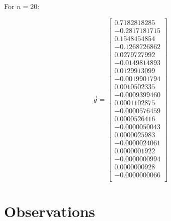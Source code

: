 \documentclass{article}
\begin{document}
For $n=20$:

$$
\vec{y}=
\begin{bmatrix}
0.7182818285\\
-0.2817181715\\
0.1548454854\\
-0.1268726862\\
0.0279727992\\
-0.0149814893\\
0.0129913099\\
-0.0019901794\\
0.0010502335\\
-0.0009399460\\
0.0001102875\\
-0.0000576459\\
0.0000526416\\
-0.0000050043\\
0.0000025983\\
-0.0000024061\\
0.0000001922\\
-0.0000000994\\
0.0000000928\\
-0.0000000066\\
\end{bmatrix}
$$

\section{Observations}
\end{document}
